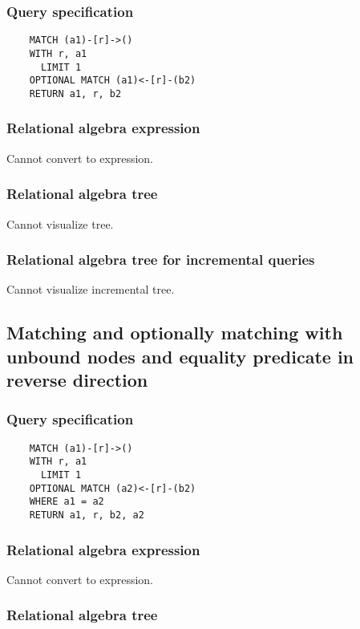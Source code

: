 	\subsubsection*{Query specification}

	\begin{lstlisting}
	MATCH (a1)-[r]->()
	WITH r, a1
	  LIMIT 1
	OPTIONAL MATCH (a1)<-[r]-(b2)
	RETURN a1, r, b2
	\end{lstlisting}


	\subsubsection*{Relational algebra expression}

	Cannot convert to expression.

	\subsubsection*{Relational algebra tree}

	Cannot visualize tree.

	\subsubsection*{Relational algebra tree for incremental queries}

	Cannot visualize incremental tree.
	\subsection{Matching and optionally matching with unbound nodes and equality predicate in reverse direction}

	\subsubsection*{Query specification}

	\begin{lstlisting}
	MATCH (a1)-[r]->()
	WITH r, a1
	  LIMIT 1
	OPTIONAL MATCH (a2)<-[r]-(b2)
	WHERE a1 = a2
	RETURN a1, r, b2, a2
	\end{lstlisting}


	\subsubsection*{Relational algebra expression}

	Cannot convert to expression.

	\subsubsection*{Relational algebra tree}

